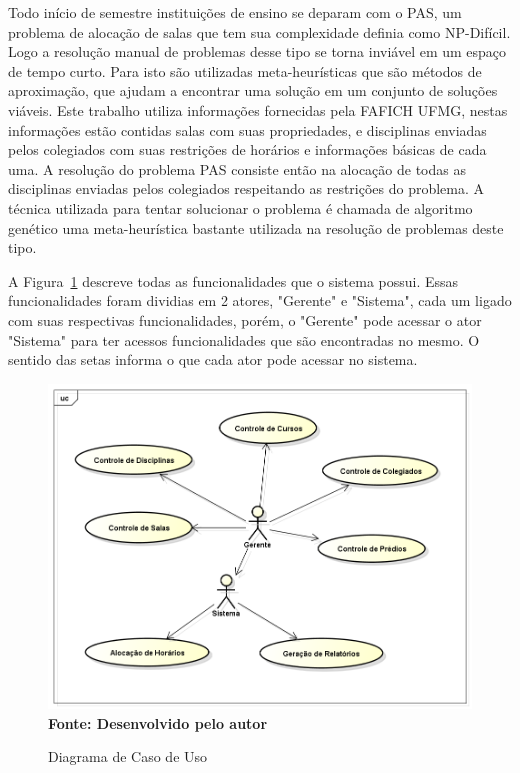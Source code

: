 
\iniciocapitulo
Todo início de semestre instituições de ensino se deparam com o PAS, um problema de alocação de salas que tem sua complexidade definia como NP-Difícil. Logo a resolução manual de problemas desse tipo se torna inviável em um espaço de tempo curto. Para isto são utilizadas meta-heurísticas que são métodos de aproximação, que ajudam a encontrar uma solução em um conjunto de soluções viáveis. Este trabalho utiliza informações fornecidas pela FAFICH UFMG, nestas informações estão contidas salas com suas propriedades, e disciplinas enviadas pelos colegiados com suas restrições de horários e informações básicas de cada uma. A resolução do problema PAS consiste então na alocação de todas as disciplinas enviadas pelos colegiados respeitando as restrições do problema. A técnica utilizada para tentar solucionar o problema é chamada de algoritmo genético uma meta-heurística bastante utilizada na resolução de problemas deste tipo.\par



A Figura~\ref{fig:casodeuso} descreve todas as funcionalidades que o sistema possui. Essas funcionalidades foram dividias em 2 atores, "Gerente" e "Sistema", cada um ligado com suas respectivas funcionalidades, porém, o "Gerente" pode acessar o ator "Sistema" para ter acessos funcionalidades que são encontradas no mesmo. O sentido das setas informa o que cada ator pode acessar no sistema.\par

\begin{figure}[!htb]
\caption[Diagrama de Caso de Uso]{Diagrama de Caso de Uso}
\label{fig:casodeuso}
\centering
\includegraphics[scale=0.5]{imagens/diagramaCasoUso.png}
\\ \textbf{\footnotesize Fonte: Desenvolvido pelo autor}
\end{figure}

